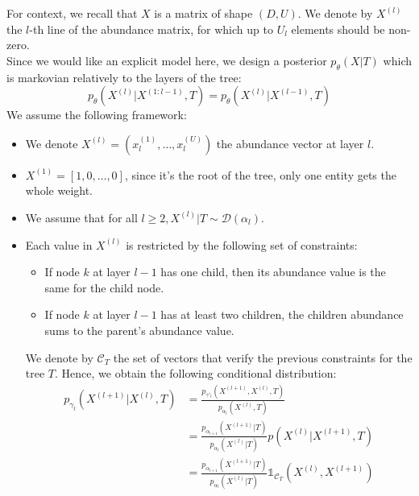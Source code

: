 For context, we recall that $X$ is a matrix of shape $(D, U)$.
We denote by $X^{(l)}$ the $l$-th line of the abundance matrix, for which up to $U_l$ elements should be non-zero. \\

Since we would like an explicit model here, we design a posterior $p_{\theta}(X|T)$ which is markovian relatively to the layers of the tree:
$$
p_{\theta}(X^{(l)} | X^{(1:l-1)}, T) = p_{\theta}(X^{(l)} | X^{(l-1)}, T)
$$
We assume the following framework:
\begin{itemize}
    \item We denote $X^{(l)} = (x_l^{(1)}, \dots, x_{l}^{(U)})$ the abundance vector at layer $l$.
    \item $X^{(1)} = [1, 0, \dots, 0]$, since it's the root of the tree, only one entity gets the whole weight.
    \item We assume that for all $l \geq 2, X^{(l)} | T \sim \mathcal{D}(\alpha_l)$.
    \item Each value in $X^{(l)}$ is restricted by the following set of constraints:
        \begin{itemize}
              \item If node $k$ at layer $l-1$ has one child, then its abundance value is the same for the child node.
              \item If node $k$ at layer $l-1$ has at least two children, the children abundance sums to the parent's abundance value.
        \end{itemize}
        We denote by $\mathcal{C}_T$ the set of vectors that verify the previous constraints for the tree $T$.
        Hence, we obtain the following conditional distribution:
        $$
        \begin{align}
            p_{\gamma_l}(X^{(l+1)} | X^{(l)}, T) &= \frac{p_{\gamma'_l}(X^{(l+1)}, X^{(l)}, T)}{p_{\alpha_l}(X^{(l)}, T)} \\
                                            &= \frac{p_{\alpha_{l+1}}(X^{(l+1)} | T)}{p_{\alpha_{l}}(X^{(l)} | T)} p(X^{(l)} | X^{(l+1)}, T) \\
                                            &= \frac{p_{\alpha_{l+1}}(X^{(l+1)} | T)}{p_{\alpha_{l}}(X^{(l)} | T)} \mathds{1}_{\mathcal{C}_T}\left(X^{(l)}, X^{(l+1)}\right)
        \end{align}
        $$
\end{itemize}

